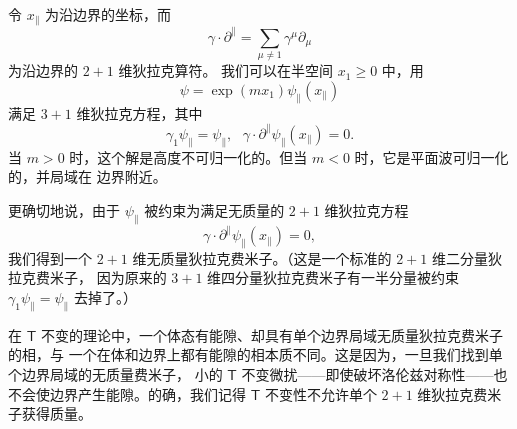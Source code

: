 \documentclass[11pt,a4paper]{article}
\numberwithin{equation}{section}
\def\sT{{\mathsf T}}
\def\be{\begin{equation}}
\def\ee{\end{equation}}
\begin{document}
令 $x_\parallel $ 为沿边界的坐标，而
\be\label{zogg}\gamma\cdot\partial^\parallel=\sum_{\mu\not=1}\gamma^\mu\partial_\mu\ee
为沿边界的 $2+1$ 维狄拉克算符。
我们可以在半空间 $x_1\geq 0$ 中，用
\be\label{ogg}\psi=\exp(mx_1)\psi_\parallel(x_\parallel)\ee
满足 $3+1$ 维狄拉克方程，其中
\be\label{pogg}\gamma_1\psi_\parallel=\psi_\parallel,~~~\gamma\cdot\partial^\parallel\psi_\parallel(x_\parallel)=0.\ee
当 $m>0$ 时，这个解是高度不可归一化的。但当 $m<0$ 时，它是平面波可归一化的，并局域在
边界附近。

更确切地说，由于 $\psi_{\parallel}$ 被约束为满足无质量的 $2+1$ 维狄拉克方程
\be\label{plogg}\gamma\cdot\partial^\parallel\psi_\parallel(x_\parallel)=0,\ee
我们得到一个 $2+1$ 维无质量狄拉克费米子。（这是一个标准的 $2+1$ 维二分量狄拉克费米子，
因为原来的 $3+1$ 维四分量狄拉克费米子有一半分量被约束
$\gamma_1\psi_{\parallel}=\psi_{\parallel}$ 去掉了。）

在 $\sT$ 不变的理论中，一个体态有能隙、却具有单个边界局域无质量狄拉克费米子的相，与
一个在体和边界上都有能隙的相本质不同。这是因为，一旦我们找到单个边界局域的无质量费米子，
小的 $\sT$ 不变微扰——即使破坏洛伦兹对称性——也不会使边界产生能隙。的确，我们记得
$\sT$ 不变性不允许单个 $2+1$ 维狄拉克费米子获得质量。
\end{document}
